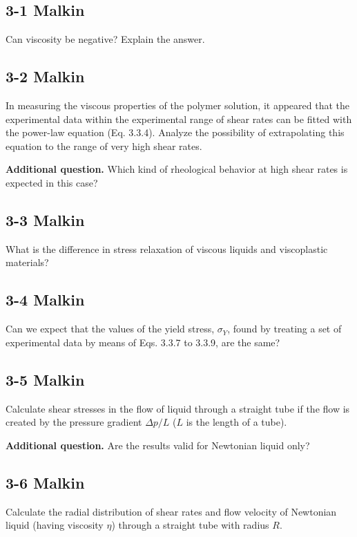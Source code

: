 \subsection{3-1 Malkin}
Can viscosity be negative? Explain the answer.

\subsection{3-2 Malkin}
In measuring the viscous properties of the polymer solution, it appeared that the experimental data within the experimental range of shear rates can be fitted with the power-law equation (Eq. 3.3.4). Analyze the possibility of extrapolating this equation to the range of very high shear rates.

\textbf{Additional question.} Which kind of rheological behavior at high shear rates is expected in this case?

\subsection{3-3 Malkin}
What is the difference in stress relaxation of viscous liquids and viscoplastic materials?

\subsection{3-4 Malkin}
Can we expect that the values of the yield stress, $\sigma_Y$, found by treating a set of experimental data by means of Eqs. 3.3.7 to 3.3.9, are the same?

\subsection{3-5 Malkin}
Calculate shear stresses in the flow of liquid through a straight tube if the flow is created by the pressure gradient $\Delta p/L$ ($L$ is the length of a tube).

\textbf{Additional question.} Are the results valid for Newtonian liquid only?

\subsection{3-6 Malkin}
Calculate the radial distribution of shear rates and flow velocity of Newtonian liquid (having viscosity $\eta$) through a straight tube with radius $R$.

